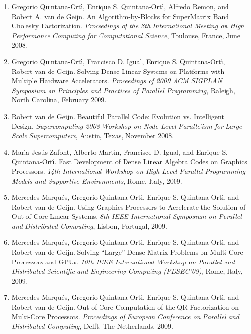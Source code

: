 \begin{enumerate}
\item
Gregorio Quintana-Ort\'{\i}, Enrique S. Quintana-Ort\'{\i}, Alfredo Remon,
and Robert A. van de Geijn.
\newblock
An Algorithm-by-Blocks for SuperMatrix Band Cholesky Factorization.
\newblock
{\em Proceedings of the 8th International Meeting on High Performance
Computing for Computational Science},
Toulouse, France, June 2008. 

\item
Gregorio Quintana-Ort\'{\i}, Francisco D. Igual,
Enrique S. Quintana-Ort\'{\i}, Robert van de Geijn.
\newblock
Solving Dense Linear Systems on Platforms with Multiple Hardware Accelerators.
\newblock
{\em Proceedings of 2009 ACM SIGPLAN Symposium on Principles and Practices
of Parallel Programming},
Raleigh, North Carolina, February 2009.

\item
Robert van de Geijn.
\newblock
Beautiful Parallel Code: Evolution vs. Intelligent Design.
\newblock
{\em Supercomputing 2008 Workshop on Node Level Parallelism for Large Scale
Supercomputers},
Austin, Texas, November 2008. 

\item
Mar\'{\i}a Jes\'us Zafont, Alberto Mart\'{\i}n, Francisco D. Igual,
and Enrique S. Quintana-Ort\'{\i}.
\newblock
Fast Development of Dense Linear Algebra Codes on Graphics Processors.
\newblock
{\em 14th International Workshop on High-Level Parallel Programming Models
and Supportive Environments},
Rome, Italy, 2009.

\item
Mercedes Marqu\'es, Gregorio Quintana-Ort\'{\i},
Enrique S. Quintana-Ort\'{\i}, and Robert van de Geijn.
\newblock
Using Graphics Processors to Accelerate the Solution of Out-of-Core Linear
Systems.
\newblock
{\em 8th IEEE International Symposium on Parallel and Distributed Computing},
Lisbon, Portugal, 2009.

\item
Mercedes Marqu\'es, Gregorio Quintana-Ort\'{\i}, 
Enrique S. Quintana-Ort\'{\i}, and Robert van de Geijn.
\newblock
Solving ``Large'' Dense Matrix Problems on Multi-Core Processors and GPUs.
\newblock
{\em 10th IEEE International Workshop on Parallel and Distributed Scientific and
Engineering Computing (PDSEC'09)},
Rome, Italy, 2009.

\item
Mercedes Marqu\'es, Gregorio Quintana-Ort\'{\i},  
Enrique S. Quintana-Ort\'{\i}, and Robert van de Geijn.
\newblock
Out-of-Core Computation of the QR Factorization on Multi-Core Processors.
\newblock
{\em Proceedings of European Conference on Parallel and Distributed Computing},
Delft, The Netherlands, 2009.

\end{enumerate}

